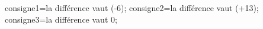 \documentclass[exercice]{thedocument}%
\begin{document}
%
\>consigne1=la différence vaut (-6);%
\>consigne2=la différence vaut (+13);%
\>consigne3=la différence vaut 0;%
%
\end{document}
